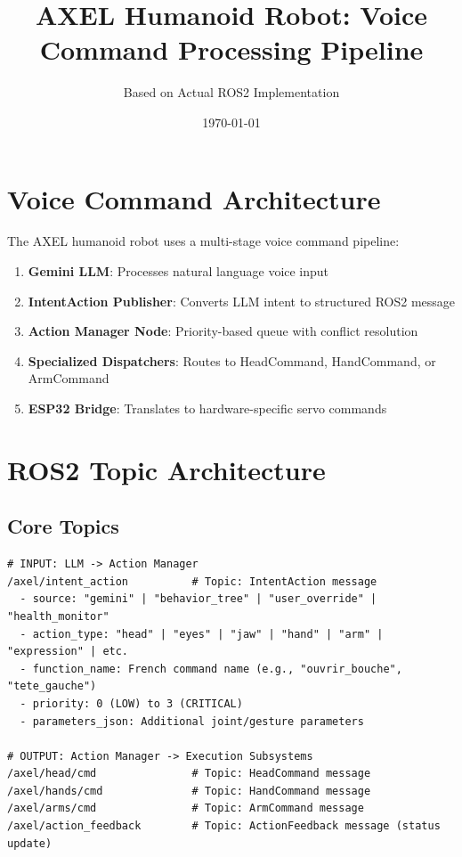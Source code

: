 \documentclass{article}
\title{AXEL Humanoid Robot: Voice Command Processing Pipeline}
\author{Based on Actual ROS2 Implementation}
\date{\today}
\begin{document}
\maketitle

\section{Voice Command Architecture}

The AXEL humanoid robot uses a multi-stage voice command pipeline:

\begin{enumerate}
    \item \textbf{Gemini LLM}: Processes natural language voice input
    \item \textbf{IntentAction Publisher}: Converts LLM intent to structured ROS2 message
    \item \textbf{Action Manager Node}: Priority-based queue with conflict resolution
    \item \textbf{Specialized Dispatchers}: Routes to HeadCommand, HandCommand, or ArmCommand
    \item \textbf{ESP32 Bridge}: Translates to hardware-specific servo commands
\end{enumerate}

\section{ROS2 Topic Architecture}

\subsection{Core Topics}

\begin{lstlisting}
# INPUT: LLM -> Action Manager
/axel/intent_action          # Topic: IntentAction message
  - source: "gemini" | "behavior_tree" | "user_override" | "health_monitor"
  - action_type: "head" | "eyes" | "jaw" | "hand" | "arm" | "expression" | etc.
  - function_name: French command name (e.g., "ouvrir_bouche", "tete_gauche")
  - priority: 0 (LOW) to 3 (CRITICAL)
  - parameters_json: Additional joint/gesture parameters

# OUTPUT: Action Manager -> Execution Subsystems
/axel/head/cmd               # Topic: HeadCommand message
/axel/hands/cmd              # Topic: HandCommand message
/axel/arms/cmd               # Topic: ArmCommand message
/axel/action_feedback        # Topic: ActionFeedback message (status update)
\end{lstlisting}
\end{document}
